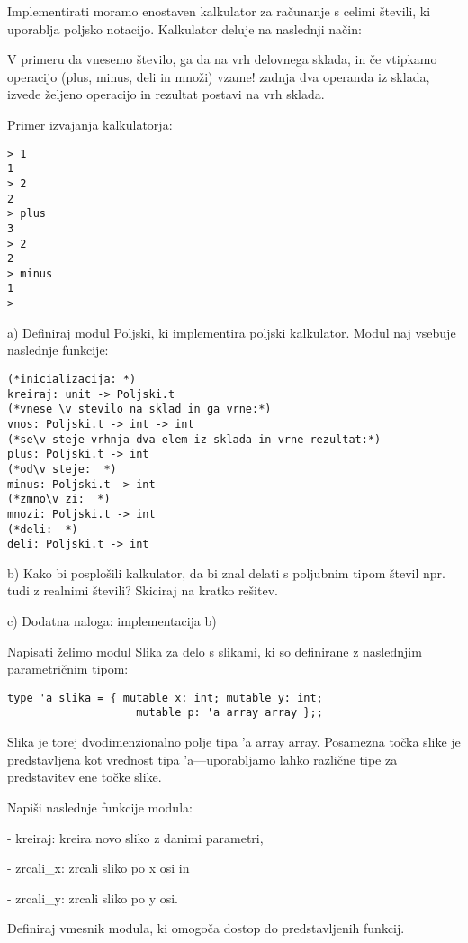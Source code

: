 \begin{ex}
Implementirati moramo enostaven kalkulator za ra\v cunanje s celimi
\v stevili, ki uporablja poljsko notacijo. Kalkulator deluje na naslednji
na\v cin:

V primeru da vnesemo \v stevilo, ga da na vrh delovnega sklada, in \v ce
vtipkamo operacijo (plus, minus, deli in mno\v zi) vzame! zadnja dva
operanda iz sklada, izvede \v zeljeno operacijo in rezultat postavi na
vrh sklada.

Primer izvajanja kalkulatorja: 
\begin{lstlisting}
> 1 
1 
> 2 
2 
> plus 
3 
> 2 
2 
> minus 
1 
> 
\end{lstlisting}

a) Definiraj modul Poljski, ki implementira poljski kalkulator. Modul
naj vsebuje naslednje funkcije:

\begin{lstlisting}
(*inicializacija: *)
kreiraj: unit -> Poljski.t      
(*vnese \v stevilo na sklad in ga vrne:*)
vnos: Poljski.t -> int -> int   
(*se\v steje vrhnja dva elem iz sklada in vrne rezultat:*)
plus: Poljski.t -> int    
(*od\v steje:  *)
minus: Poljski.t -> int         
(*zmno\v zi:  *)
mnozi: Poljski.t -> int         
(*deli:  *)
deli: Poljski.t -> int          
\end{lstlisting}

b) Kako bi posplo\v sili kalkulator, da bi znal delati s poljubnim tipom \v stevil npr. tudi z realnimi \v stevili? Skiciraj na kratko re\v sitev. 

c) Dodatna naloga: implementacija b)  
\end{ex}



\begin{ex}
Napisati \v zelimo modul Slika za delo s slikami, ki so definirane z naslednjim parametri\v cnim tipom:

\begin{lstlisting}
type 'a slika = { mutable x: int; mutable y: int;
					mutable p: 'a array array };; 
\end{lstlisting}

Slika je torej dvodimenzionalno polje tipa 'a array array. Posamezna to\v cka slike je predstavljena kot vrednost tipa 'a---uporabljamo lahko razli\v cne tipe za predstavitev ene to\v cke slike.

Napi\v si naslednje funkcije modula:

- kreiraj: kreira novo sliko z danimi parametri,

- zrcali\_x: zrcali sliko po x osi in

- zrcali\_y: zrcali sliko po y osi.

Definiraj vmesnik modula, ki omogo\v ca dostop do predstavljenih funkcij.
\end{ex}




